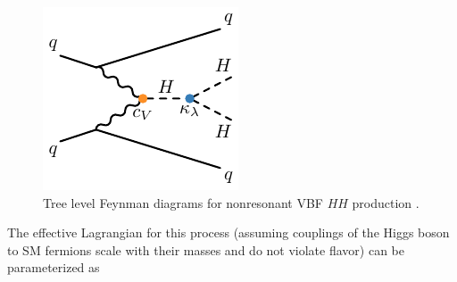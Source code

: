 \begin{figure}[!thp]
\begin{minipage}[c]{.31\textwidth}
    \end{minipage}
    \begin{minipage}[c]{.31\textwidth}
        \includegraphics[width=\textwidth]{chapters/chapter1_theory/images/vbf_klambda.pdf}
    \end{minipage}

    \caption[Tree level Feynman diagrams for nonresonant \gls{VBF} $HH$ production]{Tree level Feynman diagrams for nonresonant \gls{VBF} $HH$ production \cite{vbf_4b}.}
    \label{fig:vbf_feyn}
\end{figure}

The effective Lagrangian for this process (assuming couplings of the Higgs boson to \gls{SM} fermions scale with their masses and do not violate flavor) can be parameterized as 

